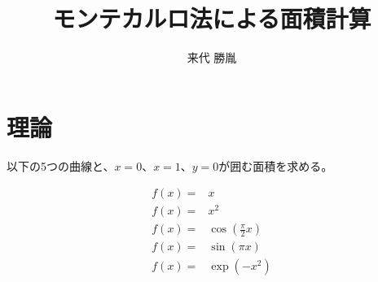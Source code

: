 \documentclass[12pt,a4paper]{jsarticle}
\author{来代 勝胤}
\title{モンテカルロ法による面積計算}
\begin{document}
\maketitle
\thispagestyle{empty}
\clearpage
\addtocounter{page}{-1}


\begin{flushleft}
    {
        \LARGE \textbf{}
    }
\end{flushleft}

\section{理論}

以下の5つの曲線と、$x=0$、$x=1$、$y=0$が囲む面積を求める。

\begin{eqnarray}
    f(x)=&x\\
    f(x)=&x^2\\
    f(x)=&\cos\left(\frac{\pi}{2}x\right)  \\
    f(x)=&\sin\left(\pi x\right) \\
    f(x)=&\exp\left(-x^2\right)
\end{eqnarray}
\end{document}
